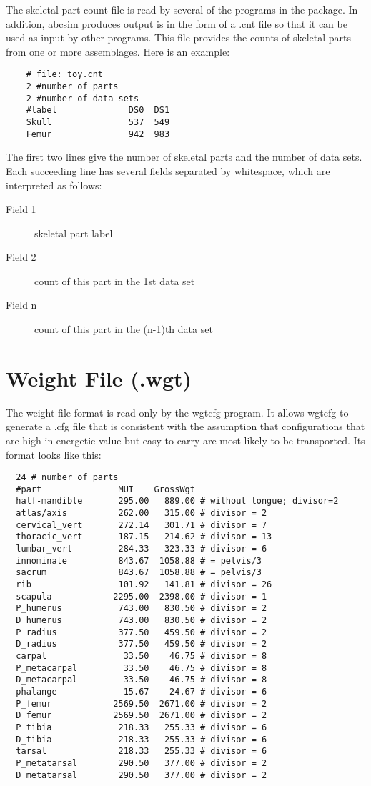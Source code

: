 The skeletal part count file is read by several of the programs in the
package.  In addition, abcsim produces output is in the form of a .cnt file so
that it can be used as input by other programs.  This file provides the counts
of skeletal parts from one or more assemblages.  Here is an example:
\begin{verbatim}
    # file: toy.cnt
    2 #number of parts
    2 #number of data sets
    #label              DS0  DS1
    Skull               537  549
    Femur               942  983
\end{verbatim}
The first two lines give the number of skeletal parts and the number
of data sets.  Each succeeding line has several fields separated by
whitespace, which are interpreted as follows:

\begin{description}
\item[Field 1]
skeletal part label

\item[Field 2]
count of this part in the 1st data set

\item[Field n]
count of this part in the (n-1)th data set
\end{description}

\section{Weight File (.wgt)\label{sec.wgt}}%

The weight file format is read only by the wgtcfg program.  It allows wgtcfg
to generate a .cfg file that is consistent with the assumption that
configurations that are high in energetic value but easy to carry are most
likely to be transported.  Its format looks like this:
\begin{verbatim}
  24 # number of parts
  #part               MUI    GrossWgt
  half-mandible       295.00   889.00 # without tongue; divisor=2
  atlas/axis          262.00   315.00 # divisor = 2
  cervical_vert       272.14   301.71 # divisor = 7
  thoracic_vert       187.15   214.62 # divisor = 13
  lumbar_vert         284.33   323.33 # divisor = 6
  innominate          843.67  1058.88 # = pelvis/3
  sacrum              843.67  1058.88 # = pelvis/3
  rib                 101.92   141.81 # divisor = 26
  scapula            2295.00  2398.00 # divisor = 1
  P_humerus           743.00   830.50 # divisor = 2
  D_humerus           743.00   830.50 # divisor = 2
  P_radius            377.50   459.50 # divisor = 2
  D_radius            377.50   459.50 # divisor = 2
  carpal               33.50    46.75 # divisor = 8
  P_metacarpal         33.50    46.75 # divisor = 8
  D_metacarpal         33.50    46.75 # divisor = 8
  phalange             15.67    24.67 # divisor = 6
  P_femur            2569.50  2671.00 # divisor = 2
  D_femur            2569.50  2671.00 # divisor = 2
  P_tibia             218.33   255.33 # divisor = 6
  D_tibia             218.33   255.33 # divisor = 6
  tarsal              218.33   255.33 # divisor = 6
  P_metatarsal        290.50   377.00 # divisor = 2
  D_metatarsal        290.50   377.00 # divisor = 2
\end{verbatim}

